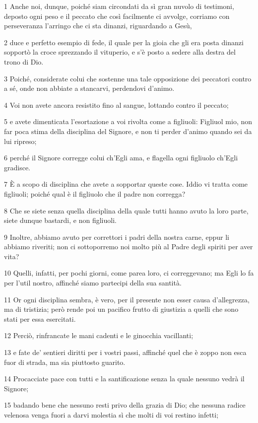 \par 1 Anche noi, dunque, poiché siam circondati da sì gran nuvolo di testimoni, deposto ogni peso e il peccato che così facilmente ci avvolge, corriamo con perseveranza l'arringo che ci sta dinanzi, riguardando a Gesù,
\par 2 duce e perfetto esempio di fede, il quale per la gioia che gli era posta dinanzi sopportò la croce sprezzando il vituperio, e s'è posto a sedere alla destra del trono di Dio.
\par 3 Poiché, considerate colui che sostenne una tale opposizione dei peccatori contro a sé, onde non abbiate a stancarvi, perdendovi d'animo.
\par 4 Voi non avete ancora resistito fino al sangue, lottando contro il peccato;
\par 5 e avete dimenticata l'esortazione a voi rivolta come a figliuoli: Figliuol mio, non far poca stima della disciplina del Signore, e non ti perder d'animo quando sei da lui ripreso;
\par 6 perché il Signore corregge colui ch'Egli ama, e flagella ogni figliuolo ch'Egli gradisce.
\par 7 È a scopo di disciplina che avete a sopportar queste cose. Iddio vi tratta come figliuoli; poiché qual è il figliuolo che il padre non corregga?
\par 8 Che se siete senza quella disciplina della quale tutti hanno avuto la loro parte, siete dunque bastardi, e non figliuoli.
\par 9 Inoltre, abbiamo avuto per correttori i padri della nostra carne, eppur li abbiamo riveriti; non ci sottoporremo noi molto più al Padre degli spiriti per aver vita?
\par 10 Quelli, infatti, per pochi giorni, come parea loro, ci correggevano; ma Egli lo fa per l'util nostro, affinché siamo partecipi della sua santità.
\par 11 Or ogni disciplina sembra, è vero, per il presente non esser causa d'allegrezza, ma di tristizia; però rende poi un pacifico frutto di giustizia a quelli che sono stati per essa esercitati.
\par 12 Perciò, rinfrancate le mani cadenti e le ginocchia vacillanti;
\par 13 e fate de' sentieri diritti per i vostri passi, affinché quel che è zoppo non esca fuor di strada, ma sia piuttosto guarito.
\par 14 Procacciate pace con tutti e la santificazione senza la quale nessuno vedrà il Signore;
\par 15 badando bene che nessuno resti privo della grazia di Dio; che nessuna radice velenosa venga fuori a darvi molestia sì che molti di voi restino infetti;
